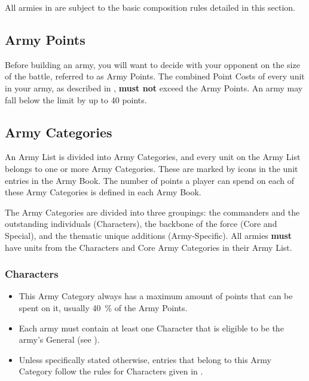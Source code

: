 All armies in \nameofthegame{} are subject to the basic composition rules detailed in this section.

\subsection{Army Points}
\label{army_points}

Before building an army, you will want to decide with your opponent on the size of the battle, referred to as Army Points. The combined Point Costs of every unit in your army, as described in , \textbf{must not} exceed the Army Points. An army may fall below the limit by up to 40 points.

\subsection{Army Categories}
\label{army_categories}

An Army List is divided into Army Categories, and every unit on the Army List belongs to one or more Army Categories. These are marked by icons in the unit entries in the Army Book. The number of points a player can spend on each of these Army Categories is defined in each Army Book.

The Army Categories are divided into three groupings: the commanders and the outstanding individuals (Characters), the backbone of the force (Core and Special), and the thematic unique additions (Army-Specific). All armies \textbf{must} have units from the Characters and Core Army Categories in their Army List.

\newpage
\subsubsection{Characters}

\begin{itemize}
\item This Army Category always has a maximum amount of points that can be spent on it, usually \SI{40}{\percent} of the Army Points.
\item Each army must contain at least one Character that is eligible to be the army's General (see ).
\item Unless specifically stated otherwise, entries that belong to this Army Category follow the rules for Characters given in .
\end{itemize}

